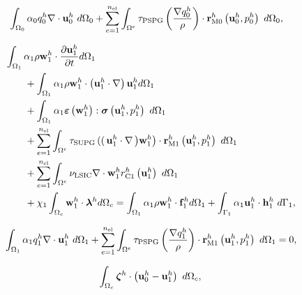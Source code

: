 \documentclass[tese_patricia]{subfiles}
\begin{document}
\begin{align}
	\begin{split}
		&	\int_{\Omega_{0}} \alpha_0 q_0^h \nabla \cdot \mathbf{u}_0^h \ d\Omega_{0} +
\sum_{e=1}^{n_{\mathrm{el}}} \int_{\Omega^e} \tau_{\mathrm{PSPG}} \left(\frac{\nabla q_0^h}{\rho}\right) \cdot \mathbf{r}_{\mathrm{M0}}^{h}\left(\mathbf{u}_0^h,p_0^h\right) \  d\Omega_{0},
		\label{eq:RC0}
	\end{split}
\end{align}


\begin{align}
	\begin{split}
		&\int_{\domain_1} \arlequinWFLocal \density \wlocalh \cdot \frac{\partial\ulocalh}{\partial t} d\domain_{1} \\ 
		&\qquad+
		\int_{\domain_1} \arlequinWFLocal \density \wlocalh \cdot  \left(\ulocalh \cdot \nabla\right)\ulocalh d\domain_{1}  \\ 
		&\qquad+	
		\int_{\domain_{1}} \arlequinWFLocal \straintensor \left(\wlocalh\right) : \stresstensor \left(\ulocalh,\plocalh\right)\ d\domain_{1} 
		\\ 
		&\qquad+ \sum_{e=1}^{\nel} \int_{\domainE} \SUPG  \left( \right(\ulocalh \cdot \nabla \left) \wlocalh\right) \cdot \resMomLocal\left(\ulocalh,\plocalh \right)\  d\domain_{1} \\ 
		&\qquad+\sum_{e=1}^{\nel} \int_{\domainE} \LSIC \nabla \cdot \wlocalh \resPreLocal
		\left(\ulocalh\right)\  d\domain_{1} \\
		&\qquad+ \chi_{1} \int_{\domain_c} \wlocalh \cdot \lagrangeMultiplier^{h} d\domain_{c}  = \int_{\domain_1} \arlequinWFLocal \density \wlocalh \cdot  \sbodyforce_{1}^{h} d\domain_{1} + \int_{\boundary_{1}} \arlequinWFLocal \ulocalh \cdot \straction_{1}^{h}\ d\boundary_{1},
		\label{eq:FinalSystem1}
	\end{split}
\end{align}


\begin{align}
	\begin{split}
		&	\int_{\Omega_{1}} \alpha_1 q_1^h \nabla \cdot \mathbf{u}_1^h \ d\Omega_{1} +
		\sum_{e=1}^{n_{\mathrm{el}}} \int_{\Omega^e} \tau_{\mathrm{PSPG}} \left(\frac{\nabla q_1^h}{\rho}\right) \cdot \mathbf{r}_{\mathrm{M1}}^{h} \left(\mathbf{u}_1^h,p_1^h\right) \  d\Omega_{1} = 0,\\
		\label{eq:RC1}
	\end{split}
\end{align}

\begin{align}
	\int_{\Omega_{c}}  \boldsymbol{\zeta}^h  \cdot \left(\mathbf{u}_0^h - \mathbf{u}_1^h \right) \ d\Omega_{c}, 
		\label{eq:EqAcopla}
\end{align}
\end{document}
